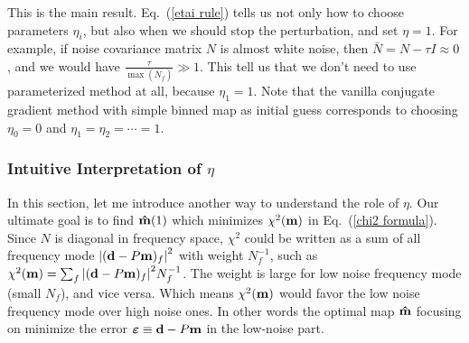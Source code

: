 \documentclass[11pt, letterpaper]{article}
\newcommand{\vbd}{\vb{d}}
\newcommand{\vbm}{\vb{m}}
\newcommand{\inv}[1]{#1^{-1}}
\newcommand{\hatm}{\vb{\hat{m}}}
\newcommand{\Nbar}{\bar{N}}
\begin{document}

This is the main result.  Eq.~(\ref{etai rule}) tells us not only how to choose parameters $\eta_i$,
but also when we should stop the perturbation, and set $\eta = 1$.
For example, if noise covariance matrix $N$ is almost white noise,
then $\Nbar = N - \tau I \approx 0$,
and we would have $\frac{\tau}{\max(\Nbar_f)} \gg 1$.
This tell us that we don't need to use parameterized method at all, 
because $\eta_1 = 1$.
Note that the vanilla conjugate gradient method with simple binned map as
initial guess corresponds to choosing $\eta_0=0$ and $\eta_1= \eta_2 = \cdots
= 1$.


\subsubsection{Intuitive Interpretation of $\eta$}\label{intuitive interp}

In this section, let me introduce another way to understand the role of $\eta$.
Our ultimate goal is to find $\hatm(1)$ which minimizes $\chi^2(\vbm)$ in Eq.~(\ref{chi2 formula}).
Since $N$ is diagonal in frequency space,
$\chi^2$ could be written as a sum of all frequency mode
$\qty|(\vbd-P\vbm)_f|^2$ with weight $\inv{N}_f$, such as
$\chi^2(\vbm) = \sum_f \qty|(\vbd-P\vbm)_f|^2 \inv{N}_f$.
The weight is large for low noise frequency mode (small $N_f$), and vice versa.
Which means $\chi^2(\vbm)$ would favor the low noise frequency mode over high
noise ones.
In other words the optimal map $\hatm$ focusing on minimize the error
$\vb*{\varepsilon} \equiv \vbd - P\vbm$ in the low-noise part.
\end{document}
